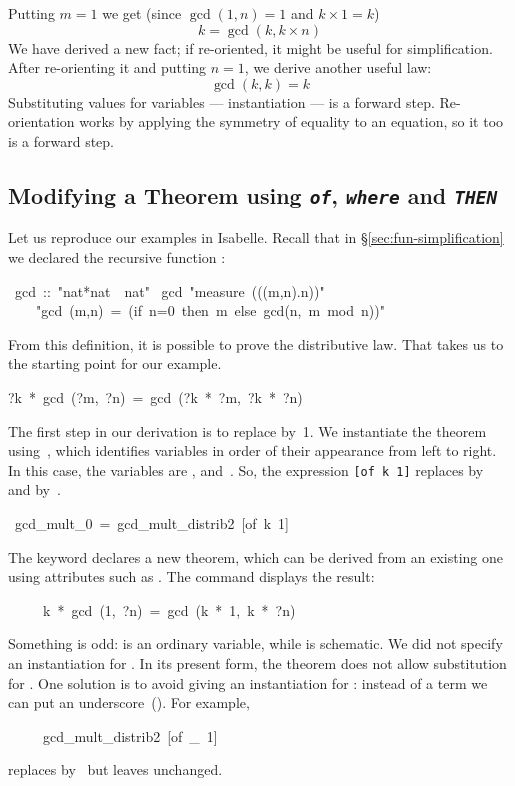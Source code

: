 Putting $m=1$ we get (since $\gcd(1,n)=1$ and $k\times1=k$) 
\[ k = \gcd(k,k\times n)\]
We have derived a new fact; if re-oriented, it might be
useful for simplification.  After re-orienting it and putting $n=1$, we
derive another useful law: 
\[ \gcd(k,k)=k \]
Substituting values for variables --- instantiation --- is a forward step. 
Re-orientation works by applying the symmetry of equality to 
an equation, so it too is a forward step.  

\subsection{Modifying a Theorem using {\tt\slshape of},  {\tt\slshape where}
 and {\tt\slshape THEN}}

\label{sec:THEN}

Let us reproduce our examples in Isabelle.  Recall that in
{\S}\ref{sec:fun-simplification} we declared the recursive function
:
\begin{isabelle}
\ gcd\ ::\ "nat*nat\ \isasymRightarrow\ nat"\isanewline
{}\ gcd\ "measure\ ((\isasymlambda(m,n).n))"\isanewline
\ \ \ \ "gcd\ (m,n)\ =\ (if\ n=0\ then\ m\ else\ gcd(n,\ m\ mod\ n))"
\end{isabelle}
%
From this definition, it is possible to prove the distributive law.  
That takes us to the starting point for our example.
\begin{isabelle}
?k\ *\ gcd\ (?m,\ ?n)\ =\ gcd\ (?k\ *\ ?m,\ ?k\ *\ ?n)
\end{isabelle}
%
The first step in our derivation is to replace  by~1.  We instantiate the
theorem using~, which identifies variables in order of their
appearance from left to right.  In this case, the variables  are , 
and~. So, the expression
\hbox{\texttt{[of k 1]}} replaces  by~ and 
by~.
\begin{isabelle}
\ gcd_mult_0\ =\ gcd_mult_distrib2\ [of\ k\ 1]
\end{isabelle}
%
The keyword  declares a new theorem, which can be derived
from an existing one using attributes such as \isa{[of~k~1]}.
The command 
displays the result:
\begin{isabelle}
\ \ \ \ \ k\ *\ gcd\ (1,\ ?n)\ =\ gcd\ (k\ *\ 1,\ k\ *\ ?n)
\end{isabelle}
Something is odd:  is an ordinary variable, while  
is schematic.  We did not specify an instantiation 
for .  In its present form, the theorem does not allow 
substitution for .  One solution is to avoid giving an instantiation for
: instead of a term we can put an underscore~(\isa{_}).  For example,
\begin{isabelle}
\ \ \ \ \ gcd_mult_distrib2\ [of\ _\ 1]
\end{isabelle}
replaces  by~ but leaves  unchanged.  

